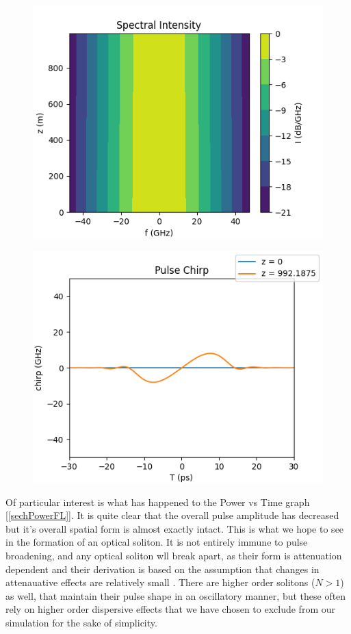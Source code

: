 \documentclass[10pt, a4paper, twocolumn]{article} %
\begin{document}
\begin{figure}
    \includegraphics[width=\linewidth]{plots/sechFreqDbFL2D.png}
    \caption{}
    \label{sechFreqDbFL2D}
\end{figure}

\begin{figure}
    \includegraphics[width=\linewidth]{plots/sechChirpFL.png}
    \caption{}
    \label{sechChirpFL}
\end{figure}

Of particular interest is what has happened to the Power vs Time graph [\ref{sechPowerFL}]. It is quite clear that the overall pulse amplitude has decreased but it's overall spatial form is almost exactly intact. This is what we hope to see in the formation of an optical soliton. It is not entirely immune to pulse broadening, and any optical soliton wll break apart, as their form is attenuation dependent and their derivation is based on the assumption that changes in attenauative effects are relatively small \cite{AgrawalChap5}. There are higher order solitons ($N > 1$) as well, that maintain their pulse shape in an oscillatory manner, but these often rely on higher order dispersive effects that we have chosen to exclude from our simulation for the sake of simplicity.
\end{document}

